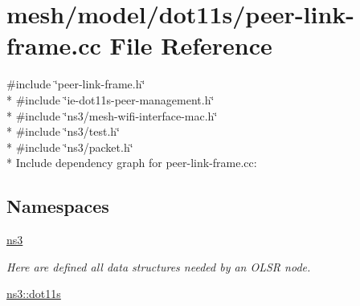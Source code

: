 \hypertarget{peer-link-frame_8cc}{}\section{mesh/model/dot11s/peer-\/link-\/frame.cc File Reference}
\label{peer-link-frame_8cc}
{\ttfamily \#include \char`\"{}peer-\/link-\/frame.\+h\char`\"{}}\\*
{\ttfamily \#include \char`\"{}ie-\/dot11s-\/peer-\/management.\+h\char`\"{}}\\*
{\ttfamily \#include \char`\"{}ns3/mesh-\/wifi-\/interface-\/mac.\+h\char`\"{}}\\*
{\ttfamily \#include \char`\"{}ns3/test.\+h\char`\"{}}\\*
{\ttfamily \#include \char`\"{}ns3/packet.\+h\char`\"{}}\\*
Include dependency graph for peer-\/link-\/frame.cc\+:
\subsection*{Namespaces}
\begin{DoxyCompactItemize}
\item 
 \hyperlink{namespacens3}{ns3}
\begin{DoxyCompactList}\small\item\em Here are defined all data structures needed by an O\+L\+SR node. \end{DoxyCompactList}\item 
 \hyperlink{namespacens3_1_1dot11s}{ns3\+::dot11s}
\end{DoxyCompactItemize}
